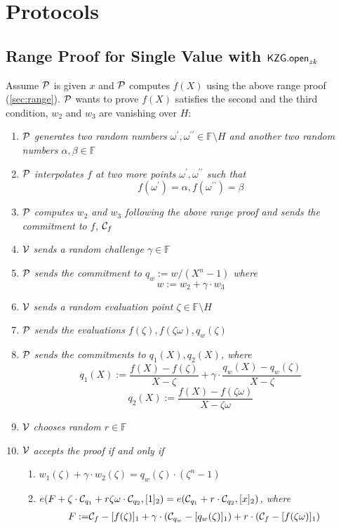 
\chapter{Protocols}

\section{Range Proof for Single Value with $\mathsf{KZG.open}_{zk}$}
\label{sec:rpzk}
Assume $\mathcal{P}$ is given $x$ and $\mathcal{P}$ computes $f(X)$ using the above range proof (\ref{sec:range}). $\mathcal{P}$ wants to prove $f(X)$ satisfies the second and the third condition, \ie $w_2$ and $w_3$ are vanishing over $H$:
\begin{enumerate}
    \item $\mathcal{P}$ \textit{generates two random numbers $\omega^{\prime},\omega^{\prime\prime}\in\mathbb{F}\setminus{H}$ and another two random numbers $\alpha,\beta\in\mathbb{F}$}
    \item $\mathcal{P}$ \textit{interpolates $f$ at two more points ${\omega^{\prime},\omega^{\prime\prime}}$ such that}
    \[ f(\omega^{\prime})=\alpha,f(\omega^{\prime\prime})=\beta \]
    \item $\mathcal{P}$ \textit{computes $w_2$ and $w_3$ following the above range proof and sends the commitment to $f$,} $\mathcal{C}_f$
    \item $\mathcal{V}$ \textit{sends a random challenge $\gamma\in\mathbb{F}$}
    \item $\mathcal{P}$ \textit{sends the commitment to $q_w:=w/(X^n-1)$ where}
    \[ w:=w_2+\gamma\cdot{w_3} \]
    \item $\mathcal{V}$ \textit{sends a random evaluation point $\zeta\in\mathbb{F}\setminus{H}$}
    \item $\mathcal{P}$ \textit{sends the evaluations $f(\zeta),f(\zeta\omega),q_w(\zeta)$}
    \item $\mathcal{P}$ \textit{sends the commitments to $q_1(X),q_2(X)$, where}
    \[ q_1(X):=\frac{f(X)-f(\zeta)}{X-\zeta}+\gamma\cdot\frac{q_w(X)-q_w(\zeta)}{X-\zeta} \]
    \[ q_2(X):=\frac{f(X)-f(\zeta\omega)}{X-\zeta\omega} \]
    \item $\mathcal{V}$ \textit{chooses random $r\in\mathbb{F}$}
    \item $\mathcal{V}$ \textit{accepts the proof if and only if}
    \begin{enumerate}
    	\item $w_1(\zeta)+\gamma\cdot{w_2(\zeta)}=q_w(\zeta)\cdot(\zeta^n-1)$
    	\item $e(F+\zeta\cdot\mathcal{C}_{q_1}+r\zeta\omega\cdot\mathcal{C}_{q_2},[1]_2)=e(\mathcal{C}_{q_1}+r\cdot\mathcal{C}_{q_2},[x]_2)$\textit{, where}
    	\begin{align*}
    		F:=&\mathcal{C}_f-[f(\zeta)]_1+\gamma\cdot(\mathcal{C}_{q_w}-[q_w(\zeta)]_1)+r\cdot(\mathcal{C}_f-[f(\zeta\omega)]_1)
    	\end{align*}
    \end{enumerate}
\end{enumerate}

